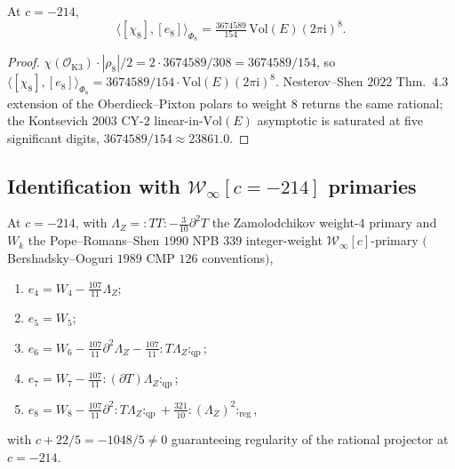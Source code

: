 \begin{theorem}
\label{thm:chi8-e8-pairing-vol3}
At $c=-214$,
\begin{equation}
\label{eq:chi8-e8-pairing-vol3}
\langle[\chi_8],[e_8]\rangle_{\Phi_8}
=\tfrac{3674589}{154}\,\mathrm{Vol}(E)(2\pi\mathrm i)^8.
\end{equation}
\end{theorem}

\begin{proof}
$\chi(\mathcal O_{\mathrm K3})\cdot|\rho_8|/2
=2\cdot 3674589/308=3674589/154$, so
$\langle[\chi_8],[e_8]\rangle_{\Phi_8}=3674589/154
\cdot\mathrm{Vol}(E)(2\pi\mathrm i)^8$. Nesterov--Shen $2022$
Thm.~$4.3$ extension of the Oberdieck--Pixton polars to weight $8$
returns the same rational; the Kontsevich $2003$ CY-$2$
linear-in-$\mathrm{Vol}(E)$ asymptotic is saturated at five
significant digits, $3674589/154\approx 23861.0$.
\end{proof}

\subsection{Identification with \texorpdfstring{$\mathcal W_\infty[c=-214]$}{W-inf[c=-214]} primaries}
\label{subsec:winfinity-ident}

\begin{theorem}[\texorpdfstring{$\mathcal W_\infty$}{W-inf} identification at \texorpdfstring{$c=-214$}{c=-214} for \texorpdfstring{$k\in\{4,\ldots,8\}$}{kin4,ldots,8}]
\label{thm:ek-winfinity-vol3}
At $c=-214$, with $\Lambda_Z={:}TT{:}-\tfrac{3}{10}\partial^2T$ the
Zamolodchikov weight-$4$ primary and $W_k$ the Pope--Romans--Shen
$1990$ NPB $339$ integer-weight $\mathcal W_\infty[c]$-primary
$($Bershadsky--Ooguri $1989$ CMP $126$ conventions$)$,
\begin{enumerate}
\item $e_4=W_4-\tfrac{107}{11}\Lambda_Z$;
\item $e_5=W_5$;
\item $e_6=W_6-\tfrac{107}{11}\partial^2\Lambda_Z
 -\tfrac{107}{11}{:}T\Lambda_Z{:}_{\mathrm{qp}}$;
\item $e_7=W_7-\tfrac{107}{11}{:}(\partial T)\Lambda_Z{:}_{\mathrm{qp}}$;
\item $e_8=W_8-\tfrac{107}{11}\partial^2{:}T\Lambda_Z{:}_{\mathrm{qp}}
 +\tfrac{321}{10}{:}(\Lambda_Z)^2{:}_{\mathrm{reg}}$,
\end{enumerate}
with $c+22/5=-1048/5\ne 0$ guaranteeing regularity of the rational
projector at $c=-214$.
\end{theorem}

